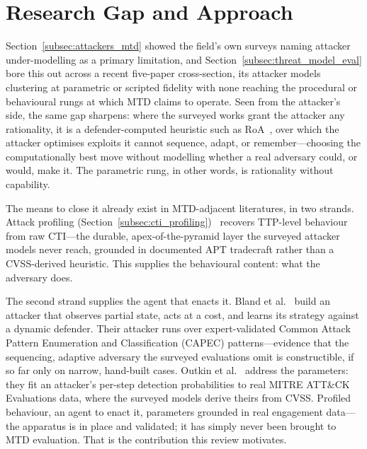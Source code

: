
\section{Research Gap and Approach}
\label{sec:gap}

Section~\ref{subsec:attackers_mtd} showed the field's own surveys naming
attacker under-modelling as a primary limitation, and
Section~\ref{subsec:threat_model_eval} bore this out across a recent
five-paper cross-section, its attacker models clustering at parametric or
scripted fidelity with none reaching the procedural or behavioural rungs
at which MTD claims to operate. Seen from the attacker's side, the same
gap sharpens: where the surveyed works grant the attacker any rationality,
it is a defender-computed heuristic such as RoA~\cite{brown2023}, over
which the attacker optimises exploits it cannot sequence, adapt, or
remember---choosing the computationally best move without modelling
whether a real adversary could, or would, make it. The parametric rung, in
other words, is rationality without capability.

The means to close it already exist in MTD-adjacent literatures, in two
strands. Attack profiling
(Section~\ref{subsec:cti_profiling})~\cite{zhangY2025, rahman2025,
rodriguez2024} recovers TTP-level behaviour from raw CTI---the durable,
apex-of-the-pyramid layer the surveyed attacker models never reach,
grounded in documented APT tradecraft rather than a CVSS-derived
heuristic. This supplies the behavioural content: what the adversary does.

The second strand supplies the agent that enacts it. Bland et
al.~\cite{bland2020} build an attacker that observes partial state, acts
at a cost, and learns its strategy against a dynamic defender. Their
attacker runs over expert-validated Common Attack Pattern Enumeration and
Classification (CAPEC) patterns---evidence that the sequencing, adaptive
adversary the surveyed evaluations omit is constructible, if so far only
on narrow, hand-built cases. Outkin et al.~\cite{outkin2022} address the
parameters: they fit an attacker's per-step detection probabilities to
real MITRE ATT\&CK Evaluations data, where the surveyed models derive
theirs from CVSS. Profiled behaviour, an agent to enact it, parameters
grounded in real engagement data---the apparatus is in place and
validated; it has simply never been brought to MTD evaluation. That is the
contribution this review motivates.

